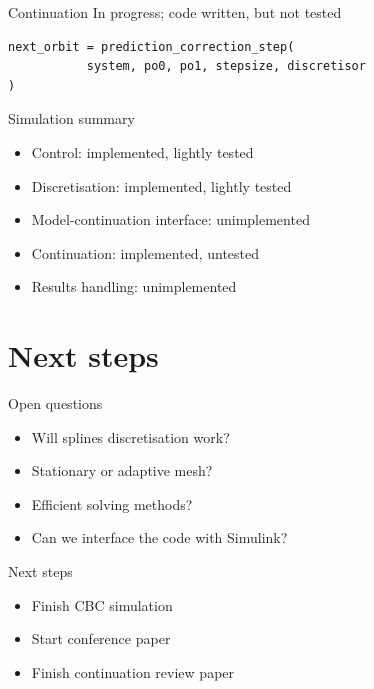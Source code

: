 \documentclass[presentation]{beamer}
\begin{document}
\begin{frame}[fragile,label={sec:org953858b}]{Continuation}
 In progress; code written, but not tested

\vfill

\begin{verbatim}
next_orbit = prediction_correction_step(
	       system, po0, po1, stepsize, discretisor
)
\end{verbatim}
\end{frame}

\begin{frame}[label={sec:orgc6e2d45}]{Simulation summary}
\begin{itemize}
\item Control: implemented, lightly tested
\item Discretisation: implemented, lightly tested
\item Model-continuation interface: unimplemented
\item Continuation: implemented, untested
\item Results handling: unimplemented
\end{itemize}
\end{frame}

\section{Next steps}
\label{sec:org8c3db1e}
\begin{frame}[label={sec:org408c62b}]{Open questions}
\begin{itemize}
\item Will splines discretisation work?
\item Stationary or adaptive mesh?
\item Efficient solving methods?
\item Can we interface the code with Simulink?
\end{itemize}
\end{frame}



\begin{frame}[label={sec:orgd63fdef}]{Next steps}
\begin{itemize}
\item Finish CBC simulation
\item Start conference paper
\item Finish continuation review paper
\end{itemize}
\end{frame}
\end{document}
